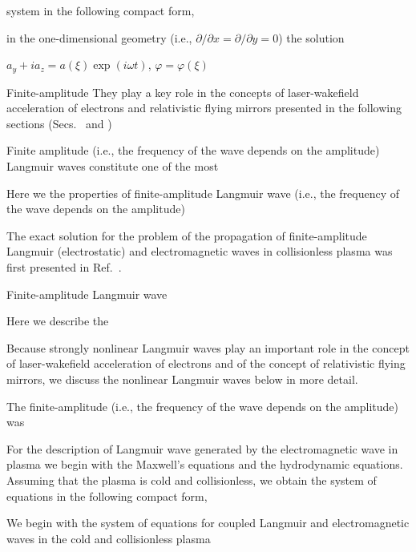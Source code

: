 \documentclass[10pt, a4paper, twoside, openright]{report}
\begin{document}
system in the following compact form,

in the one-dimensional geometry (i.e., $ \partial / \partial x = \partial / \partial y = 0 $) the solution 

$ a_y + i a_z = a \left( \xi \right) \exp \left( i \omega t \right) $, $ \varphi = \varphi \left( \xi \right) $

Finite-amplitude  They play a key role in the concepts of laser-wakefield acceleration of electrons and relativistic flying mirrors presented in the following sections (Secs.~ and )


Finite amplitude (i.e., the frequency of the wave depends on the amplitude) Langmuir waves  constitute one of the most  

Here we the properties of finite-amplitude Langmuir wave (i.e., the frequency of the wave depends on the amplitude) 

The exact solution for the problem of the propagation of finite-amplitude Langmuir (electrostatic) and electromagnetic waves in collisionless plasma was first presented in Ref.~.

Finite-amplitude Langmuir wave 

Here we describe the 

Because strongly nonlinear Langmuir waves play an important role in the concept of laser-wakefield acceleration of electrons and of the concept of relativistic flying mirrors, we discuss the nonlinear Langmuir waves below in more detail.

The finite-amplitude (i.e., the frequency of the wave depends on the amplitude) was 

For the description of Langmuir wave generated by the electromagnetic wave in plasma we begin with the Maxwell's equations and the hydrodynamic equations. Assuming that the plasma is cold and collisionless, we obtain the system of equations in the following compact form,

We begin with the system of equations for coupled Langmuir and electromagnetic waves in the cold and collisionless plasma 





%

\end{document}
